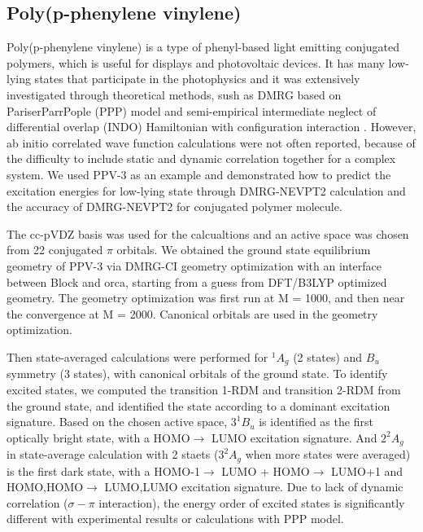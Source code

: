 \subsection{Poly(p-phenylene vinylene)}

Poly(p-phenylene vinylene) is a type of phenyl-based light emitting conjugated polymers, which is useful for displays and photovoltaic devices. It has many low-lying states that participate in the photophysics and it was extensively investigated through theoretical methods, sush as DMRG based on Pariser\textendash Parr\textendash Pople (PPP) model \cite{shukla_correlated_2002}\cite{bursill_symmetry-adapted_2009} and semi-empirical intermediate neglect of differential overlap (INDO) Hamiltonian with configuration interaction \cite{beljonne_theoretical_1995}. 
However, ab initio correlated wave function calculations were not often reported, because of the difficulty to include static and dynamic correlation together for a complex system.
We used PPV-3 as an example and demonstrated how to predict the excitation energies for low-lying state through DMRG-NEVPT2 calculation and the accuracy of DMRG-NEVPT2 for conjugated polymer molecule.

The cc-pVDZ basis was used for the calcualtions and an active space was chosen from 22 conjugated $\pi$ orbitals. We obtained the ground state equilibrium geometry of PPV-3 via DMRG-CI geometry optimization\cite{hu_excited-state_2015} with an interface between Block and orca\cite{neese_orca_2012}, starting from a guess from DFT/B3LYP optimized geometry. The geometry optimization was first run at M = 1000, and then near the convergence at M = 2000. Canonical orbitals are used in the geometry optimization.

Then state-averaged calculations were performed for $^1A_g$ (2 states) and $B_u$ symmetry (3 states), with canonical orbitals of the ground state. 
To identify excited states, we computed the transition 1-RDM and transition 2-RDM from the ground state, and identified the state according to a dominant excitation signature.
Based on the chosen active space, $3^1B_u$ is identified as the first optically bright state, with a HOMO$\rightarrow$ LUMO excitation signature. And $2^2A_g$ in state-average calculation with 2 staets ($3^2A_g$ when more states were averaged) is the first dark state, with a HOMO-1$\rightarrow$ LUMO + HOMO$\rightarrow$ LUMO+1 and HOMO,HOMO$\rightarrow$ LUMO,LUMO excitation signature.
Due to lack of dynamic correlation ($\sigma-\pi$ interaction), the energy order of excited states is significantly different with experimental results or calculations with PPP model.

